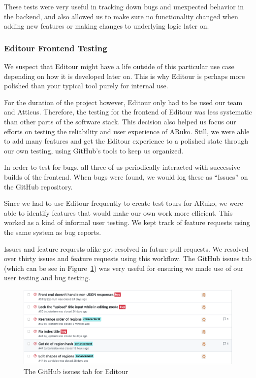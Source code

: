 \documentclass[a4paper, 10pt, american, titlepage]{article}
\begin{document}
These tests were very useful in tracking down bugs and unexpected behavior in
the backend, and also allowed us to make sure no functionality changed when
adding new features or making changes to underlying logic later on.

\subsubsection{Editour Frontend Testing}
\label{sec:editourFrontendTesting}

We suspect that Editour might have a life outside of this particular use case
depending on how it is developed later on. This is why Editour is perhaps more
polished than your typical tool purely for internal use.

For the duration of the project however, Editour only had to be used our team
and Atticus. Therefore, the testing for the frontend of Editour was less
systematic than other parts of the software stack. This decision also helped us
focus our efforts on testing the reliability and user experience of ARuko.
Still, we were able to add many features and get the Editour experience to a
polished state through our own testing, using GitHub's tools to keep us
organized.

In order to test for bugs, all three of us periodically interacted with
successive builds of the frontend. When bugs were found, we would log these as
``Issues'' on the GitHub repository.

Since we had to use Editour frequently to create test tours for ARuko, we were
able to identify features that would make our own work more efficient. This
worked as a kind of informal user testing. We kept track of feature requests
using the same system as bug reports.

Issues and feature requests alike got resolved in future pull requests. We
resolved over thirty issues and feature requests using this workflow. The GitHub
issues tab (which can be see in Figure~\ref{fig:issuesPageExample}) was very
useful for ensuring we made use of our user testing and bug testing.

\begin{figure}[h]
	\centering
	\includegraphics[width=\textwidth]{issues-page-example.png}
	\caption{The GitHub issues tab for Editour}
	\label{fig:issuesPageExample}
\end{figure}
\end{document}
